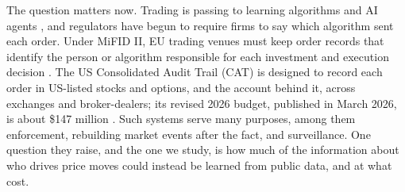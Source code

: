 \documentclass[12pt]{article}
\theoremstyle{definition}
\theoremstyle{remark}
\begin{document}
The question matters now. Trading is passing to learning algorithms and AI agents \citep{colliard2022,dou2025}, and regulators have begun to require firms to say which algorithm sent each order. Under MiFID II, EU trading venues must keep order records that identify the person or algorithm responsible for each investment and execution decision \citep{rts24,esma2016}. The US Consolidated Audit Trail (CAT) is designed to record each order in US-listed stocks and options, and the account behind it, across exchanges and broker-dealers; its revised 2026 budget, published in March 2026, is about \$147 million \citep{sec2012,catbudget2026}. Such systems serve many purposes, among them enforcement, rebuilding market events after the fact, and surveillance. One question they raise, and the one we study, is how much of the information about who drives price moves could instead be learned from public data, and at what cost.
\end{document}
